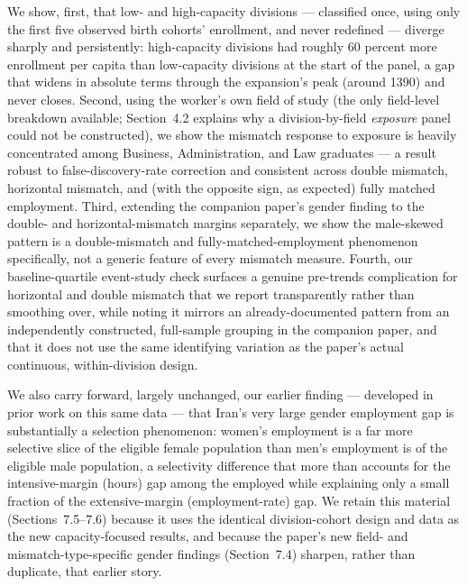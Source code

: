 \documentclass[11pt]{article}
\begin{document}
We show, first, that low- and high-capacity divisions --- classified once, using only the first five observed birth cohorts' enrollment, and never redefined --- diverge sharply and persistently: high-capacity divisions had roughly 60 percent more enrollment per capita than low-capacity divisions at the start of the panel, a gap that widens in absolute terms through the expansion's peak (around 1390) and never closes. Second, using the worker's own field of study (the only field-level breakdown available; Section~4.2 explains why a division-by-field \emph{exposure} panel could not be constructed), we show the mismatch response to exposure is heavily concentrated among Business, Administration, and Law graduates --- a result robust to false-discovery-rate correction and consistent across double mismatch, horizontal mismatch, and (with the opposite sign, as expected) fully matched employment. Third, extending the companion paper's gender finding to the double- and horizontal-mismatch margins separately, we show the male-skewed pattern is a double-mismatch and fully-matched-employment phenomenon specifically, not a generic feature of every mismatch measure. Fourth, our baseline-quartile event-study check surfaces a genuine pre-trends complication for horizontal and double mismatch that we report transparently rather than smoothing over, while noting it mirrors an already-documented pattern from an independently constructed, full-sample grouping in the companion paper, and that it does not use the same identifying variation as the paper's actual continuous, within-division design.

We also carry forward, largely unchanged, our earlier finding --- developed in prior work on this same data --- that Iran's very large gender employment gap is substantially a selection phenomenon: women's employment is a far more selective slice of the eligible female population than men's employment is of the eligible male population, a selectivity difference that more than accounts for the intensive-margin (hours) gap among the employed while explaining only a small fraction of the extensive-margin (employment-rate) gap. We retain this material (Sections~7.5--7.6) because it uses the identical division-cohort design and data as the new capacity-focused results, and because the paper's new field- and mismatch-type-specific gender findings (Section~7.4) sharpen, rather than duplicate, that earlier story.
\end{document}
